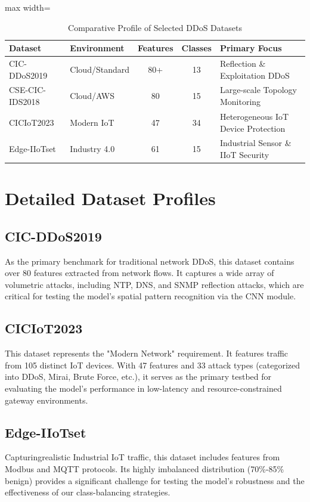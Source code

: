 \documentclass[12pt, a4paper]{report}
\begin{document}
\begin{table}[h!]
\centering
\caption{Comparative Profile of Selected DDoS Datasets}
\label{tab:datasets}
\begin{adjustbox}{max width=\linewidth}
\begin{tabular}{|l|l|c|c|l|}
\hline
\textbf{Dataset} & \textbf{Environment} & \textbf{Features} & \textbf{Classes} & \textbf{Primary Focus} \\ \hline
CIC-DDoS2019 & Cloud/Standard & 80+ & 13 & Reflection \& Exploitation DDoS \\ \hline
CSE-CIC-IDS2018 & Cloud/AWS & 80 & 15 & Large-scale Topology Monitoring \\ \hline
CICIoT2023 \cite{neto2023ciciot2023} & Modern IoT & 47 & 34 & Heterogeneous IoT Device Protection \\ \hline
Edge-IIoTset \cite{ferrag2022edge} & Industry 4.0 & 61 & 15 & Industrial Sensor \& IIoT Security \\ \hline
\end{tabular}
\end{adjustbox}
\end{table}

\section{Detailed Dataset Profiles}
\subsection{CIC-DDoS2019}
As the primary benchmark for traditional network DDoS, this dataset contains over 80 features extracted from network flows. It captures a wide array of volumetric attacks, including NTP, DNS, and SNMP reflection attacks, which are critical for testing the model's spatial pattern recognition via the CNN module.

\subsection{CICIoT2023}
This dataset represents the "Modern Network" requirement. It features traffic from 105 distinct IoT devices. With 47 features and 33 attack types (categorized into DDoS, Mirai, Brute Force, etc.), it serves as the primary testbed for evaluating the model's performance in low-latency and resource-constrained gateway environments.

\subsection{Edge-IIoTset}
Capturingrealistic Industrial IoT traffic, this dataset includes features from Modbus and MQTT protocols. Its highly imbalanced distribution (70\%-85\% benign) provides a significant challenge for testing the model's robustness and the effectiveness of our class-balancing strategies.
\end{document}
